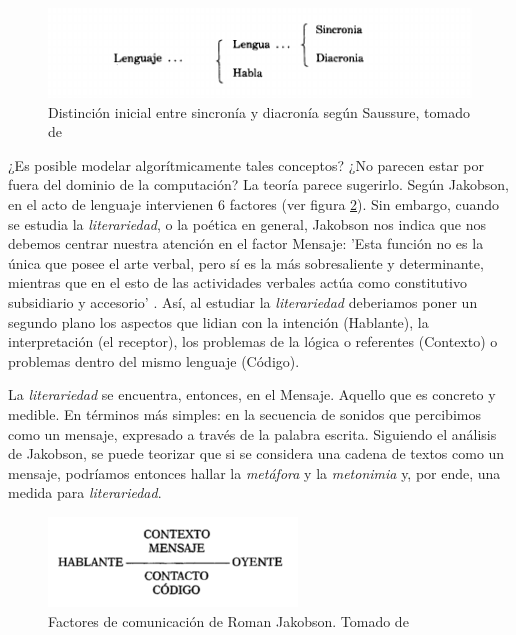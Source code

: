 \documentclass[12pt,letterpaper,twoside]{article}
\begin{document}
\begin{figure}[htbp]
\centering
\includegraphics[width=.9\linewidth]{./assets/clasificacion_saussure.png}
\caption{\label{fig:orgb87e47a}Distinción inicial entre sincronía y diacronía según Saussure, tomado de \cite{alonso1945curso}}
\end{figure}

¿Es posible modelar algorítmicamente tales conceptos? ¿No parecen
estar por fuera del dominio de la computación? La teoría parece
sugerirlo. Según Jakobson, en el acto de lenguaje intervienen 6
factores (ver figura \ref{fig:org84dd563}). Sin embargo, cuando se
estudia la \emph{literariedad}, o la poética en general, Jakobson nos
indica que nos debemos centrar nuestra atención en el factor Mensaje:
'Esta función no es la única que posee el arte verbal, pero sí es la
más sobresaliente y determinante, mientras que en el esto de las
actividades verbales actúa como constitutivo subsidiario y accesorio'
\cite{jakobson1981linguistica}.  Así, al estudiar la \emph{literariedad}
deberiamos poner un segundo plano los aspectos que lidian con la
intención (Hablante), la interpretación (el receptor), los problemas
de la lógica o referentes (Contexto) o problemas dentro del mismo
lenguaje (Código).

La \emph{literariedad} se encuentra, entonces, en el Mensaje. Aquello que
es concreto y medible.  En términos más simples: en la secuencia de
sonidos que percibimos como un mensaje, expresado a través de la
palabra escrita. Siguiendo el análisis de Jakobson, se puede teorizar
que si se considera una cadena de textos como un mensaje, podríamos
entonces hallar la \emph{metáfora} y la \emph{metonimia} y, por ende, una medida
para \emph{literariedad}.


\begin{figure}[htbp]
\centering
\includegraphics[width=250px]{./assets/factores_comunicacion.png}
\caption{\label{fig:org84dd563}Factores de comunicación de Roman Jakobson. Tomado de \cite{jakobson1981linguistica}}
\end{figure}
\end{document}
